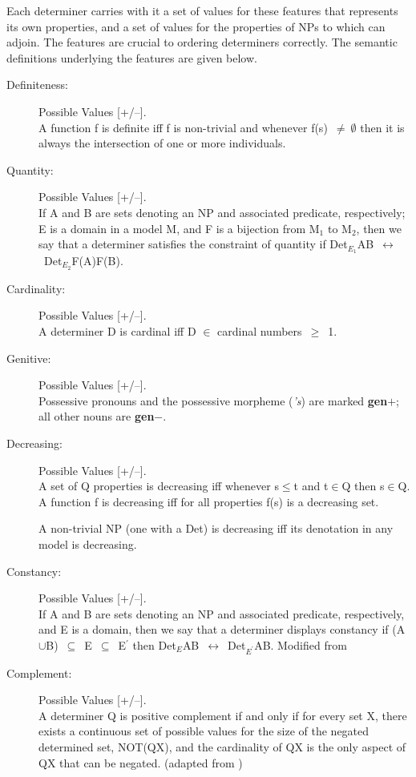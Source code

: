 Each determiner carries with it a set of values for these features 
that represents its own properties, and a set of values for the 
properties of NPs to which can adjoin. The features are crucial to 
ordering determiners correctly. The semantic definitions 
underlying the features are given below. 
 
\begin{description} 
 
\item[Definiteness:] Possible Values [+/--]. \\ 
A function f is definite iff f is non-trivial and whenever 
f(s)~$\neq~\emptyset$ then it is always the intersection of one or 
more individuals.  \cite{KeenanStavi86:LP} 
 
\item[Quantity:]  Possible Values [+/--]. \\ 
If A and B are sets denoting an NP and associated predicate, respectively; E is 
a domain in a model M, and F is a bijection from M$_{1}$ to M$_{2}$, then we 
say that a determiner satisfies the constraint of quantity if 
Det$_{E_{1}}$AB~$\leftrightarrow$~Det$_{E_{2}}$F(A)F(B). \cite{Partee90:BK} 
 
\item[Cardinality:]  Possible Values [+/--]. \\ 
A determiner D is cardinal iff D $\in$ cardinal numbers~$\geq$~1. 
 
\item[Genitive:]  Possible Values [+/--]. \\ 
Possessive pronouns and the possessive morpheme ({\it 's}) are marked {\bf gen$+$}; all other nouns are {\bf gen$-$}. 
 
\item[Decreasing:]  Possible Values [+/--]. \\ 
A set of Q properties is decreasing iff whenever s$\leq$t and t$\in$Q then 
s$\in$Q. A function f is decreasing iff for all properties f(s) is a decreasing 
set. 
 
A non-trivial NP (one with a Det) is decreasing iff its denotation in any model 
is decreasing. \cite{KeenanStavi86:LP} 
 
\item[Constancy:] Possible Values [+/--]. \\ 
If A and B are sets denoting an NP and associated predicate, respectively, and 
E is a domain, then we say that a determiner displays constancy if 
(A$\cup$B)~$\subseteq$~E~$\subseteq$~E$^{\prime}$ then 
Det$_{E}$AB~$\leftrightarrow$~Det$_{E^{\prime}}$AB. Modified from 
\cite{Partee90:BK} 
 
\item[Complement:] Possible Values [+/--]. \\ 
A determiner Q is positive complement if and only if for every set X, there 
exists a continuous set of possible values for the size of the negated 
determined set, NOT(QX), and the cardinality of QX is the only aspect of QX 
that can be negated. (adapted from \cite{Mateyak97}) 
 
\end{description} 
 
